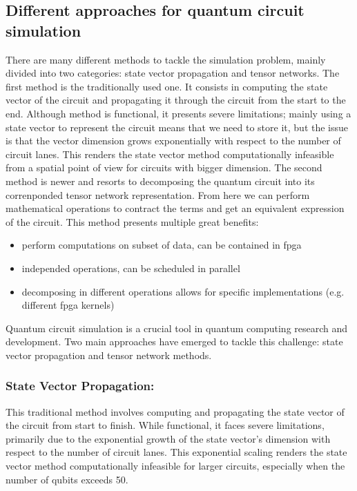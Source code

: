 \documentclass[12pt,oneside,a4paper]{article}
\begin{document}
\subsection{Different approaches for quantum circuit simulation}
There are many different methods to tackle the simulation problem, mainly divided into two categories: state vector propagation and tensor networks.
The first method is the traditionally used one. It consists in computing the state vector of the circuit and propagating it through the circuit from the start to the end. Although method is functional, it presents severe limitations; mainly using a state vector to represent the circuit means that we need to store it, but the issue is that the vector dimension grows exponentially with respect to the number of circuit lanes. This renders the state vector method computationally infeasible from a spatial point of view for circuits with bigger dimension.
The second method is newer and resorts to decomposing the quantum circuit into its correnponded tensor network representation. From here we can perform mathematical operations to contract the terms and get an equivalent expression of the circuit.
This method presents multiple great benefits:
\begin{itemize}
    \item perform computations on subset of data, can be contained in fpga
    \item independed operations, can be scheduled in parallel
    \item decomposing in different operations allows for specific implementations (e.g. different fpga kernels)
\end{itemize}

Quantum circuit simulation is a crucial tool in quantum computing research and development. Two main approaches have emerged to tackle this challenge: state vector propagation and tensor network methods.

\subsubsection{State Vector Propagation:}
This traditional method involves computing and propagating the state vector of the circuit from start to finish. While functional, it faces severe limitations, primarily due to the exponential growth of the state vector's dimension with respect to the number of circuit lanes. This exponential scaling renders the state vector method computationally infeasible for larger circuits, especially when the number of qubits exceeds 50.
\end{document}
